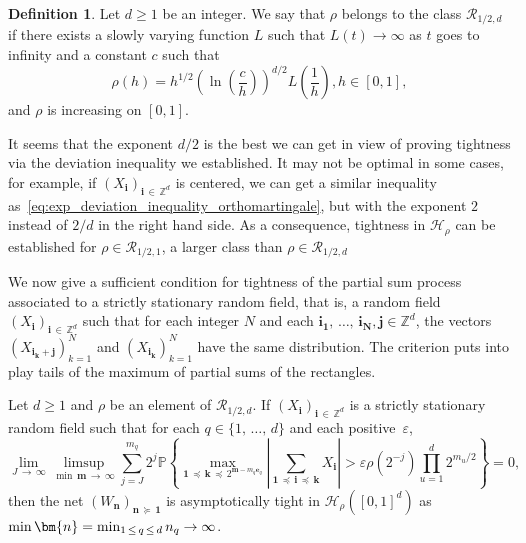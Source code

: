 \documentclass[10pt]{amsart}
\theoremstyle{definition}\newtheorem{defi}[theo]{Definition}\newtheorem{rema}[theo]{Remark}\newtheorem{exam}[theo]{Example}\newtheorem{exem}[theo]{Example}\newtheorem{nota}[theo]{Notation}
\newcommand{\Hca}{\mathcal{H}}
\newcommand{\Rca}{\mathcal{R}}
\newcommand{\clH}{\mathcal{H}}
\newcommand\PP{\mathbb{P}}
\newcommand\Z{\mathbb{Z}}
\newcommand\ens[1]{\{ #1\}}
\newcommand{\pr}[1]{(#1)}
\newcommand{\gr}[1]{\bm{#1}}
\newcommand{\gri}{\bm{i}}
\newcommand{\grj}{\bm{j}}
\newcommand{\grn}{\bm{n}}
\newcommand{\grm}{\bm{m}}
\newcommand{\grk}{\bm{k}}
\newcommand{\imd}{\preccurlyeq}
\newcommand{\smd}{\succcurlyeq }
\begin{document}
\begin{defi}
Let $d\geq 1$ be an integer. We say that $\rho$ belongs to the class $\Rca_{1/2,d}$ if there exists a slowly varying function $L$ such that $L\pr{t}\to \infty$ as $t$ goes to infinity and a constant $c$ such that
\begin{equation}\label{eq:def_de_rho}
\rho\pr{h}=h^{1/2}\left(\ln\left(\frac{c}{h}\right)\right)^{d/2}L\left(\frac 1h\right), h
\in [0,1],
\end{equation}
and $\rho $ is increasing on $[0,1]$.
\end{defi}

It seems that the exponent $d/2$ is the best we can get in view of proving tightness via the deviation inequality we established. It may not be optimal in some cases, for example, if $\pr{X_{\gri}}_{\gri\,\in\,\Z^d}$ is centered, we can get a similar inequality as~\eqref{eq:exp_deviation_inequality_orthomartingale}, but with the exponent $2$ instead of $2/d$ in the right hand side. As a consequence, tightness in $\Hca_{\rho}$ can be established for $\rho\in\Rca_{1/2,1}$, a larger class than $\rho\in\Rca_{1/2,d}$


We now give a sufficient condition for tightness of the partial sum process associated to a strictly stationary random field, that is, a random field $\pr{X_{\gri}}_{\gri\,\in\,\Z^d}$ such that for each integer $N$ and each $\gr{i_1},\,\dots,\,\gr{i_N},\gr{j}\in\Z^d$, the vectors $\pr{X_{\gr{i_k}+\grj}}_{k=1}^N$ and $\pr{X_{\gr{i_k}}}_{k=1}^N$ have the same distribution. The criterion puts into play tails of the maximum of partial sums of the rectangles.

\begin{prop}\label{prop:tightness_partial_sums}
Let $d\geq 1$ and $\rho$ be an element of $\Rca_{1/2,d}$. If $\pr{X_{\gri}}_{\gri\,\in\,\Z^d}$ is a strictly stationary random field such that for each $q\in \ens{1,\,\dots,\,d}$ and each positive~$\varepsilon$,
\begin{equation}\label{eq:tightness_random_fields_sufficient_cond}
\lim_{J\,\to\,\infty}\limsup_{\min\,\grm\,\to\,\infty}
\sum_{j=J}^{m_q}2^j \PP\left\{\max_{\gr{1}\,\imd\,\gr{k}\,\imd\,2^{\grm -m_q\gr{e}_q } }
\left|\sum_{\gr{1}\,\imd\,\gri\,\imd\,\grk} X_{\gri} \right|> \varepsilon\rho\left(2^{-j}\right)
\prod_{u=1}^d2^{m_u/2}\right\}=0,
\end{equation}
then the net $(W_{\grn})_{\grn\,\smd\, \gr{1}}$ is asymptotically tight in $\clH_{\rho}([0,1]^d)$ as $\min\grn=
\min_{1\,\leq\,q\,\leq\,d}n_q\linebreak\to\infty$.
\end{prop}
\end{document}
